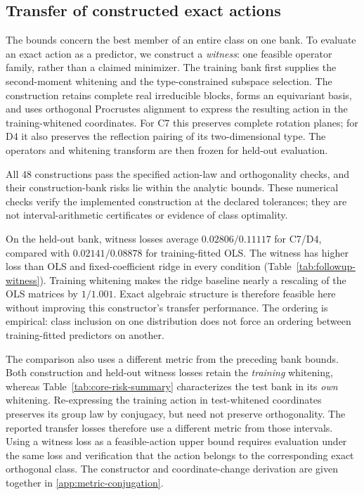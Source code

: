 \subsection{Transfer of constructed exact actions}
\label{sec:witness-transfer}

The bounds concern the best member of an entire class on one bank. To evaluate an exact action as a predictor, we construct a \emph{witness}: one feasible operator family, rather than a claimed minimizer. The training bank first supplies the second-moment whitening and the type-constrained subspace selection. The construction retains complete real irreducible blocks, forms an equivariant basis, and uses orthogonal Procrustes alignment to express the resulting action in the training-whitened coordinates. For C7 this preserves complete rotation planes; for D4 it also preserves the reflection pairing of its two-dimensional type. The operators and whitening transform are then frozen for held-out evaluation.

All 48 constructions pass the specified action-law and orthogonality checks, and their construction-bank risks lie within the analytic bounds. These numerical checks verify the implemented construction at the declared tolerances; they are not interval-arithmetic certificates or evidence of class optimality.

On the held-out bank, witness losses average $0.02806/0.11117$ for C7/D4, compared with $0.02141/0.08878$ for training-fitted OLS. The witness has higher loss than OLS and fixed-coefficient ridge in every condition (Table~\ref{tab:followup-witness}). Training whitening makes the ridge baseline nearly a rescaling of the OLS matrices by $1/1.001$. Exact algebraic structure is therefore feasible here without improving this constructor's transfer performance. The ordering is empirical: class inclusion on one distribution does not force an ordering between training-fitted predictors on another.

The comparison also uses a different metric from the preceding bank bounds. Both construction and held-out witness losses retain the \emph{training} whitening, whereas Table~\ref{tab:core-risk-summary} characterizes the test bank in its \emph{own} whitening. Re-expressing the training action in test-whitened coordinates preserves its group law by conjugacy, but need not preserve orthogonality. The reported transfer losses therefore use a different metric from those intervals. Using a witness loss as a feasible-action upper bound requires evaluation under the same loss and verification that the action belongs to the corresponding exact orthogonal class. The constructor and coordinate-change derivation are given together in \cref{app:metric-conjugation}.


